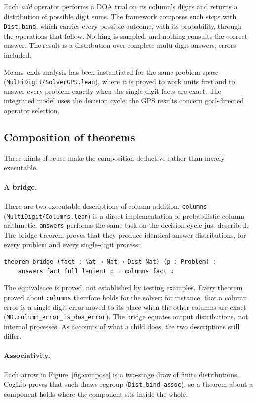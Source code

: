 \documentclass[11pt]{article}
\newcommand{\code}[1]{\texttt{#1}}
\newcommand{\lean}[1]{\texttt{#1}}
\begin{document}
Each \emph{add} operator performs a DOA trial on its column's digits and returns a distribution of possible digit sums. The framework composes such steps with \code{Dist.bind}, which carries every possible outcome, with its probability, through the operations that follow. Nothing is sampled, and nothing consults the correct answer. The result is a distribution over complete multi-digit answers, errors included.

Means--ends analysis has been instantiated for the same problem space (\code{MultiDigit/SolverGPS.lean}), where it is proved to work units first and to answer every problem exactly when the single-digit facts are exact. The integrated model uses the decision cycle; the GPS results concern goal-directed operator selection.

\subsection{Composition of theorems}

Three kinds of reuse make the composition deductive rather than merely executable.

\paragraph{A bridge.} There are two executable descriptions of column addition. \code{columns} (\code{MultiDigit/Columns.lean}) is a direct implementation of probabilistic column arithmetic. \code{answers} performs the same task on the decision cycle just described. The bridge theorem proves that they produce identical answer distributions, for every problem and every single-digit process:
\begin{Verbatim}[fontsize=\small]
theorem bridge (fact : Nat → Nat → Dist Nat) (p : Problem) :
    answers fact full lenient p = columns fact p
\end{Verbatim}
The equivalence is proved, not established by testing examples. Every theorem proved about \code{columns} therefore holds for the solver; for instance, that a column error is a single-digit error moved to its place when the other columns are exact (\lean{MD.column\_error\_is\_doa\_error}). The bridge equates output distributions, not internal processes. As accounts of what a child does, the two descriptions still differ.

\paragraph{Associativity.} Each arrow in Figure~\ref{fig:compose} is a two-stage draw of finite distributions. CogLib proves that such draws regroup (\lean{Dist.bind\_assoc}), so a theorem about a component holds where the component sits inside the whole.
\end{document}
